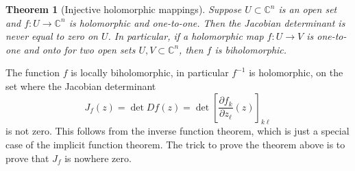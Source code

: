 \documentclass[UTF8,11pt]{ctexart}
\newtheorem*{theorem}{Theorem}
\theoremstyle{definition}
\newcommand{\C}{\mathbb C}
\begin{document}
\begin{theorem}[Injective holomorphic mappings]
Suppose $U\subset\C^n$ is an open set and $f\colon U\to\C^n$ is holomorphic and one-to-one. Then the Jacobian determinant is never equal to zero on $U$.
In particular, if a holomorphic map $f\colon U\to V$ is one-to-one and onto for two open sets $U,V\subset\C^n$, then $f$ is biholomorphic.
\end{theorem}
The function $f$ is locally biholomorphic, in particular $f^{-1}$ is holomorphic, on the set where the Jacobian determinant
\[J_f(z)=\det Df(z)=\det\left[\frac{\partial f_k}{\partial z_\ell}(z)\right]_{k\ell}\]
is not zero. This follows from the inverse function theorem, which is just a special case of the implicit function theorem. The trick to prove the theorem above is to prove that $J_f$ is nowhere zero.
\end{document}
